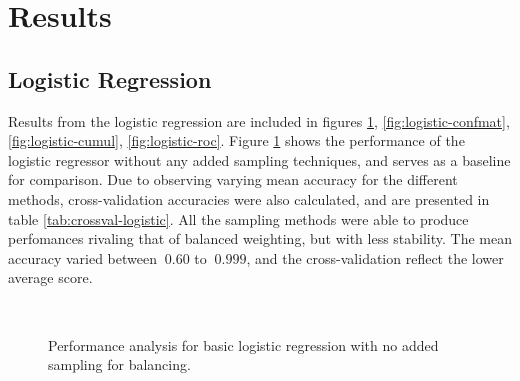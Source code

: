 \section{Results}
\subsection{Logistic Regression}
Results from the logistic regression are included in figures 
\ref{fig:logistic-basic}, \ref{fig:logistic-confmat}, \ref{fig:logistic-cumul}, 
\ref{fig:logistic-roc}. Figure \ref{fig:logistic-basic} shows the performance of
the logistic regressor without any added sampling techniques, and serves as
a baseline for comparison.
Due to observing varying mean accuracy for the different methods,
cross-validation accuracies were also calculated, and are presented in table
\ref{tab:crossval-logistic}.
All the sampling methods were able to produce perfomances rivaling that of
balanced weighting, but with less stability. The mean accuracy varied between
$~0.60$ to $~0.999$, and the cross-validation reflect the lower average score. 

\begin{figure}[H]
\begin{center}
     \\
\end{center}
\caption[caption]{Performance analysis for basic logistic regression with no
                    added sampling for balancing.}
\label{fig:logistic-basic}
\end{figure}

